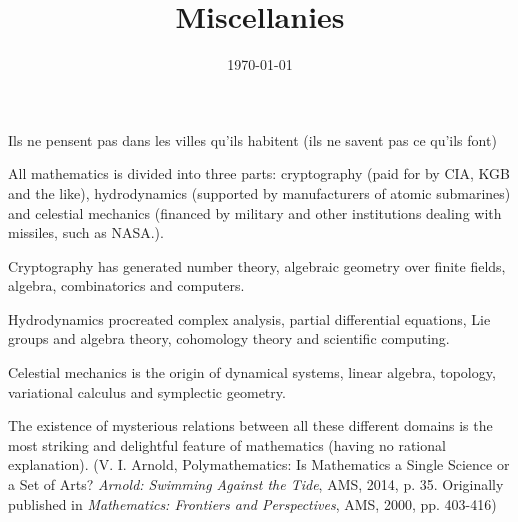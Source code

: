 \documentclass{article}
\title{Miscellanies}
\date{\today}
\begin{document}
\maketitle


Ils ne pensent pas dans les villes qu'ils habitent (ils ne savent pas ce qu'ils font)

\bigskip

All mathematics is divided into three parts: cryptography (paid for by CIA, KGB and the like), hydrodynamics (supported by manufacturers of atomic submarines) and celestial mechanics (financed by military and other institutions dealing with missiles, such as NASA.). 

Cryptography has generated number theory, algebraic geometry over finite fields, algebra, combinatorics and computers. 

Hydrodynamics procreated complex analysis, partial differential equations, Lie groups and algebra theory, cohomology theory and scientific computing. 

Celestial mechanics is the origin of dynamical systems, linear algebra, topology, variational calculus and symplectic geometry. 

The existence of mysterious relations between all these different domains is the most striking and delightful feature of mathematics (having no rational explanation). (V. I. Arnold, Polymathematics: Is Mathematics a Single Science or a Set of Arts? \textit{Arnold: Swimming Against the Tide}, AMS, 2014, p. 35. Originally published in \textit{Mathematics: Frontiers and Perspectives}, AMS, 2000, pp. 403-416)
\end{document}
